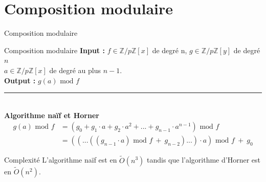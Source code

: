 \documentclass[10pt,a4paper]{beamer}
\begin{document}
\section{Composition modulaire}
\begin{frame}{Composition modulaire}
    \begin{block}{Composition modulaire}
        \textbf{Input :} $f \in \mathbb{Z}/p\mathbb{Z}[x]$ de degré n, $g \in \mathbb{Z}/p\mathbb{Z}[y]$ de degré $n$ \\ $a \in \mathbb{Z}/p\mathbb{Z}[x]$ de degré au plus $n-1$. \\
        \textbf{Output :} $g(a)\text{ mod }f$
    \end{block}
    \rule{\linewidth}{0.2mm}\\[0.5cm]
    
    \textbf{Algorithme naïf et Horner}
    \begin{align*} 
        g(a) \text{ mod }f &=(g_0+g_1\cdot a+g_2\cdot a^2+...+g_{n-1}\cdot a^{n-1}) \text{ mod } f \\
            &= ((...((g_{n-1}\cdot a)\text{ mod }f\ +\ g_{n-2})...)\cdot a)\text{ mod }f\ +\ g_0
    \end{align*}

    \begin{alertblock}{Complexité}
        L'algorithme naïf est en $\tilde{O}(n^3)$ tandis que l'algorithme d'Horner est en $\tilde{O}(n^2)$.
    \end{alertblock}
\end{frame}
\end{document}
